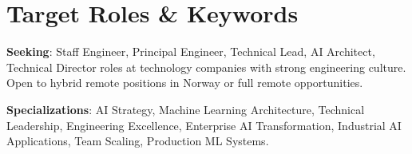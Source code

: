 \documentclass[singlesided,
               paper=a4,
               fontsize=10pt
              ]{my-resume}
\begin{document}
\section[\faGears]{Target Roles \& Keywords}
\textbf{Seeking}: Staff Engineer, Principal Engineer, Technical Lead, AI Architect, Technical Director roles at technology companies with strong engineering culture. Open to hybrid remote positions in Norway or full remote opportunities.

\textbf{Specializations}: AI Strategy, Machine Learning Architecture, Technical Leadership, Engineering Excellence, Enterprise AI Transformation, Industrial AI Applications, Team Scaling, Production ML Systems.
\end{document}
